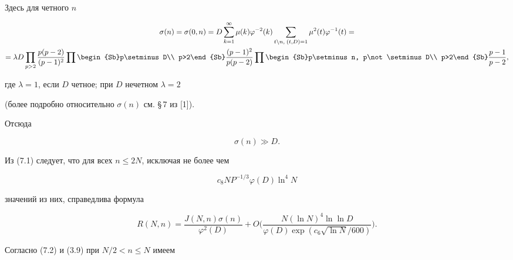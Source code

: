 Здесь для четного $n$


\begin{multline*}


\sigma(n)=\sigma(0,n)=D\sum_{k=1}^{\infty}\mu(k)\varphi^{-2}(k)


\sum_{t\setminus n,\; (t,D)=1}\mu^2(t)\varphi^{-1}(t)= \\


%


=\lambda D\prod\limits_{p>2}\frac{p(p-2)}{(p-1)^2}


\prod\begin{Sb}p\setminus D\\ p>2\end{Sb}\frac{(p-1)^2}{p(p-2)}


\prod\begin{Sb}p\setminus n, p\not\setminus D\\ p>2\end{Sb}\frac{p-1}{p-2},


\end{multline*}


где $\lambda = 1$, если $D$ четное; при $D$ нечетном $\lambda = 2$


(более подробно относительно $\sigma(n)$ см. \S\,7 из [1]).


Отсюда


\begin{equation}


\sigma(n)\gg D.


\end{equation}


Из (7.1) следует, что для всех $n\le 2N$, исключая не более чем


\begin{equation}


c_8 NP^{-1/3}\varphi(D)\ln^4 N


\end{equation} 


значений из них, справедлива формула


\begin{equation}


R(N,n)=\frac{J(N,n)\sigma(n)}{\varphi^2(D)}+


O\bigg(\frac{N(\ln N)^4\ln\ln D}{\varphi(D)\exp(c_6\sqrt{\ln N}/600)}\bigg).


\end{equation}


Согласно (7.2) и (3.9) при $N/2<n\le N$ имеем


$$


